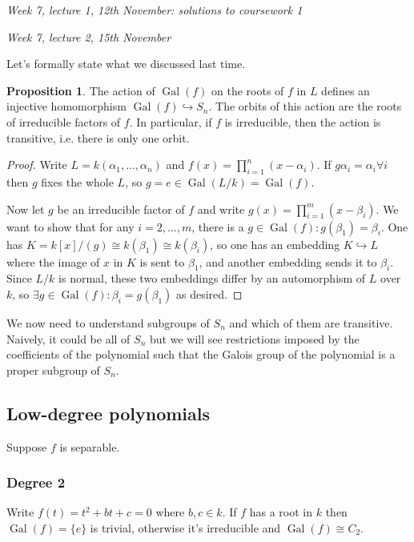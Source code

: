 \documentclass{article}
\newcommand{\Gal}{\operatorname{Gal}}
\theoremstyle{definition}
\newtheorem{prop}[defn]{Proposition}
\begin{document}
\begin{flushright}
\textit{Week 7, lecture 1, 12th November: solutions to coursework 1}
\end{flushright}

\begin{flushright}
\textit{Week 7, lecture 2, 15th November}
\end{flushright}

Let's formally state what we discussed last time.

\begin{prop}
\label{prop:GalfissubgpofSn}
The action of $\Gal(f)$ on the roots of $f$ in $L$ defines an injective homomorphism $\Gal(f)\hookrightarrow S_n$. The orbits of this action are the roots of irreducible factors of $f$. In particular, if $f$ is irreducible, then the action is transitive, i.e. there is only one orbit.
\end{prop}
\begin{proof}
Write $L=k(\alpha_1,\ldots,\alpha_n)$ and $f(x)=\prod_{i=1}^n(x-\alpha_i)$. If $g\alpha_i=\alpha_i\forall i$ then $g$ fixes the whole $L$, so $g=e\in\Gal(L/k)=\Gal(f)$.

Now let $g$ be an irreducible factor of $f$ and write $g(x)=\prod_{i=1}^m (x-\beta_i)$. We want to show that for any $i=2,\ldots,m$, there is a $g\in\Gal(f):g(\beta_1)=\beta_i$. One has $K=k[x]/(g)\cong k(\beta_1)\cong k(\beta_i)$, so one has an embedding $K\hookrightarrow L$ where the image of $x$ in $K$ is sent to $\beta_1$, and another embedding sends it to $\beta_i$. Since $L/k$ is normal, these two embeddings differ by an automorphism of $L$ over $k$, so $\exists g\in\Gal(f):\beta_i=g(\beta_1)$ as desired.
\end{proof}

We now need to understand subgroups of $S_n$ and which of them are transitive. Naively, it could be all of $S_n$ but we will see restrictions imposed by the coefficients of the polynomial such that the Galois group of the polynomial is a proper subgroup of $S_n$.

\subsection{Low-degree polynomials}
Suppose $f$ is separable.

\subsubsection{Degree 2}
Write $f(t)=t^2+bt+c=0$ where $b,c\in k$. If $f$ has a root in $k$ then $\Gal(f)=\{e\}$ is trivial, otherwise it's irreducible and $\Gal(f)\cong C_2$.
\end{document}
